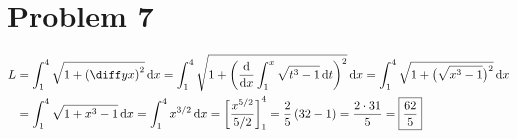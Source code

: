 \documentclass[preview, margin=0.6in]{standalone}
\newcommand*{\problem}[1]{\section*{Problem #1}}
\newcommand*{\deriv}[1][x]{\ensuremath{\dfrac{\mathrm{d}}{\mathrm{d}#1}}}
\begin{document}
\problem{7}
$\begin{aligned}[t]
	L&=\int_{1}^{4}\sqrt{1+\left(\diff yx\right)^2}\,\mathrm{d}x
	=\int_{1}^{4}\sqrt{1+\left(\deriv[x]\int_{1}^{x}\sqrt{t^3-1}\,\mathrm{d}t\right)^2}\,\mathrm{d}x
	=\int_{1}^{4}\sqrt{1+\big(\sqrt{x^3-1}\big)^2}\,\mathrm{d}x \\
	&=\int_{1}^{4}\sqrt{1+x^3-1}\,\mathrm{d}x
	=\int_{1}^{4}x^{3/2}\,\mathrm{d}x
	=\left[\frac{x^{5/2}}{5/2}\right]_{1}^{4}
	=\frac25 \left(32-1\right)
	=\frac{2\cdot31}{5}
	=\boxed{\frac{62}{5}}
\end{aligned}$
\end{document}
